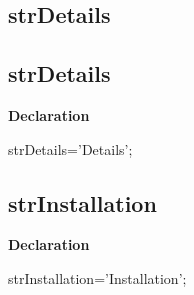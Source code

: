\documentclass{report}
\newif\ifpdf
\begin{document}
\subsection*{\large{\textbf{strDetails}}\normalsize\hspace{1ex}\hrulefill}
\else
\subsection*{strDetails}
\fi
\label{trstrings-strDetails}
\begin{list}{}{
\setlength{\itemindent}{0cm}
\setlength{\listparindent}{0cm}
\setlength{\leftmargin}{\evensidemargin}
\addtolength{\leftmargin}{\tmplength}
\settowidth{\labelsep}{X}
\addtolength{\leftmargin}{\labelsep}
\setlength{\labelwidth}{\tmplength}
}
\item[\textbf{Declaration}\hfill]
\ifpdf
\begin{flushleft}
\fi
\begin{ttfamily}
strDetails='Details';\end{ttfamily}

\ifpdf
\end{flushleft}
\fi

\end{list}
\ifpdf
\subsection*{\large{\textbf{strInstallation}}\normalsize\hspace{1ex}\hrulefill}
\else
\subsection*{strInstallation}
\fi
\label{trstrings-strInstallation}
\begin{list}{}{
\setlength{\itemindent}{0cm}
\setlength{\listparindent}{0cm}
\setlength{\leftmargin}{\evensidemargin}
\addtolength{\leftmargin}{\tmplength}
\settowidth{\labelsep}{X}
\addtolength{\leftmargin}{\labelsep}
\setlength{\labelwidth}{\tmplength}
}
\item[\textbf{Declaration}\hfill]
\ifpdf
\begin{flushleft}
\fi
\begin{ttfamily}
strInstallation='Installation';\end{ttfamily}

\ifpdf
\end{flushleft}
\fi

\end{list}
\ifpdf
\end{document}
